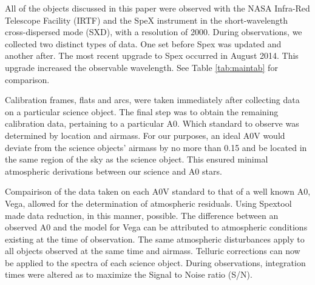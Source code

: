 
All of the objects discussed in this paper were observed with the NASA Infra-Red Telescope Facility (IRTF) and the SpeX instrument \cite{Rayner_1998} in the short-wavelength cross-dispersed mode (SXD), with a resolution of 2000.  During observations, we collected two distinct types of data.  One set before Spex was updated and another after.  The most recent upgrade to Spex occurred in August 2014.  This upgrade increased the observable wavelength.  See Table \ref{tab:maintab} for comparison.


Calibration frames, flats and arcs, were taken immediately after collecting data on a particular science object.  The final step was to obtain the remaining calibration data, pertaining to a particular A0.  Which standard to observe was determined by location and airmass.  For our purposes, an ideal A0V would deviate from the science objects' airmass by no more than 0.15 and be located in the same region of the sky as the science object.  This ensured minimal atmospheric derivations between our science and A0 stars.



Compairison of the data taken on each A0V standard to that of a well known A0, Vega, allowed for the determination of atmospheric residuals.  Using Spextool made data reduction, in this manner, possible.  The difference between an observed A0 and the model for Vega can be attributed to atmospheric conditions existing at the time of observation.  The same atmospheric disturbances apply to all objects observed at the same time and airmass.  Telluric corrections can now be applied to the spectra of each science object.  During observations, integration times were altered as to maximize the Signal to Noise ratio (S/N). \cite{Cushing_2004}\\